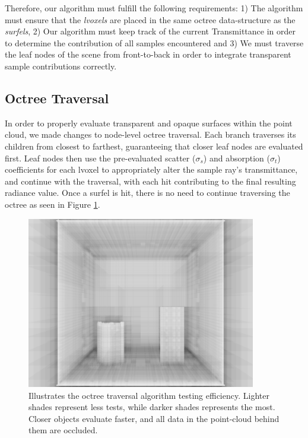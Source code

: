 \documentclass[12pt]{ucthesis}
\begin{document}
Therefore, our algorithm must fulfill the following requirements: 1) The algorithm must ensure that the \textit{lvoxels} are placed in the same octree data-structure as the \textit{surfels}, 2) Our algorithm must keep track of the current Transmittance in order to determine the contribution of all samples encountered and 3) We must traverse the leaf nodes of the scene from front-to-back in order to integrate transparent sample contributions correctly.

\subsection{Octree Traversal}

In order to properly evaluate transparent and opaque surfaces within the point cloud, we made changes to node-level octree traversal.  Each branch traverses its children from closest to farthest, guaranteeing that closer leaf nodes are evaluated first.  Leaf nodes then use the pre-evaluated scatter ($\sigma_{s}$) and absorption ($\sigma_{t}$) coefficients for each lvoxel to appropriately alter the sample ray's transmittance, and continue with the traversal, with each hit contributing to the final resulting radiance value.  Once a surfel is hit, there is no need to continue traversing the octree as seen in Figure \ref{fig:testing}.

\begin{figure}[h!]
    \centering
    \includegraphics[width=100mm]{img/testing.png}
    \caption{Illustrates the octree traversal algorithm testing efficiency.  Lighter shades represent less tests, while darker shades represents the most.  Closer objects evaluate faster, and all data in the point-cloud behind them are occluded.}
    \label{fig:testing}
\end{figure}
\end{document}
